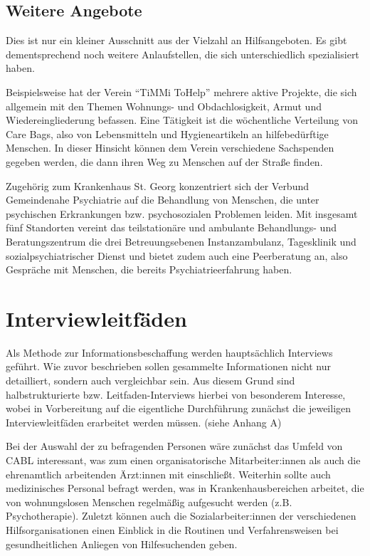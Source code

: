 \subsection{Weitere Angebote}

Dies ist nur ein kleiner Ausschnitt aus der Vielzahl an Hilfsangeboten. Es gibt dementsprechend noch weitere Anlaufstellen, die sich unterschiedlich spezialisiert haben.

Beispielsweise hat der Verein \enquote{TiMMi ToHelp} mehrere aktive Projekte, die sich allgemein mit den Themen Wohnungs- und Obdachlosigkeit, Armut und Wiedereingliederung befassen. Eine Tätigkeit ist die wöchentliche Verteilung von Care Bags, also von Lebensmitteln und Hygieneartikeln  an hilfebedürftige Menschen. In dieser Hinsicht können dem Verein verschiedene Sachspenden gegeben werden, die dann ihren Weg zu Menschen auf der Straße finden. \citep{TiMMi}

Zugehörig zum Krankenhaus St. Georg konzentriert sich der Verbund Gemeindenahe Psychiatrie auf die Behandlung von Menschen, die unter psychischen Erkrankungen bzw. psychosozialen Problemen leiden. Mit insgesamt fünf Standorten vereint das teilstationäre und ambulante Behandlungs- und Beratungszentrum die drei Betreuungsebenen Instanzambulanz, Tagesklinik und sozialpsychiatrischer Dienst und bietet zudem auch eine Peerberatung an, also Gespräche mit Menschen, die bereits Psychiatrieerfahrung haben. \citep{VGP}


\section{Interviewleitfäden}

Als Methode zur Informationsbeschaffung werden hauptsächlich Interviews geführt. Wie zuvor beschrieben sollen gesammelte Informationen nicht nur detailliert, sondern auch vergleichbar sein. Aus diesem Grund sind halbstrukturierte bzw. Leitfaden-Interviews hierbei von besonderem Interesse, wobei in Vorbereitung auf die eigentliche Durchführung zunächst die jeweiligen Interviewleitfäden erarbeitet werden müssen. (siehe Anhang A)

Bei der Auswahl der zu befragenden Personen wäre zunächst das Umfeld von CABL interessant, was zum einen organisatorische Mitarbeiter:innen als auch die ehrenamtlich arbeitenden Ärzt:innen mit einschließt. Weiterhin sollte auch medizinisches Personal befragt werden, was in Krankenhausbereichen arbeitet, die von wohnungslosen Menschen regelmäßig aufgesucht werden (z.B. Psychotherapie). Zuletzt können auch die Sozialarbeiter:innen der verschiedenen Hilfsorganisationen einen Einblick in die Routinen und Verfahrensweisen bei gesundheitlichen Anliegen von Hilfesuchenden geben.

